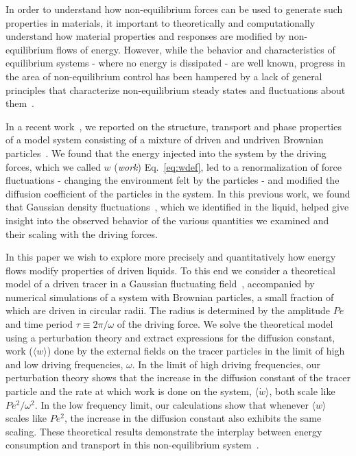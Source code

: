 \documentclass[pre,amsmath,preprintnumbers,10pt,article,notitlepage,twocolumn]{revtex4-1}
\begin{document}
In order to understand how non-equilibrium forces can be used to generate such properties in materials, it important to theoretically and computationally understand how material properties and responses are modified by non-equilibrium flows of energy. However, while the behavior and characteristics of equilibrium systems - where no energy is dissipated - are well known, progress in the area of non-equilibrium control has been hampered by a lack of general principles that characterize non-equilibrium steady states and fluctuations about them~\cite{Takatori2015,Fodor2016,Cates2015,Solon2015a,Nguyen2016,Murugan2017,Nguyen2018}. 


In a recent work~\cite{delJunco2018}, we reported on the structure, transport and phase properties of a model system consisting of a mixture of driven and undriven Brownian particles~\cite{Han2016}. We found that the energy injected into the system by the driving forces, which we called $w$ (\textit{work}) Eq.~\ref{eq:wdef}, led to a renormalization of force fluctuations - changing the environment felt by the particles - and modified the diffusion coefficient of the particles in the system. In this previous work, we found that Gaussian density fluctuations~\cite{Chandler1993}, which we identified in the liquid, helped give insight into the observed behavior of the various quantities we examined and their scaling with the driving forces.

In this paper we wish to explore more precisely and quantitatively how energy flows modify properties of driven liquids. To this end we consider a theoretical model of a driven tracer in a Gaussian fluctuating field~\cite{Chandler1993,Dean1996,Kruger2017,Demery2014}, accompanied by numerical simulations of a system with Brownian particles, a small fraction of which are driven in circular radii. The radius is determined by the amplitude $Pe$ and time period $\tau\equiv 2 \pi/\omega$ of the driving force. We solve the theoretical model using a perturbation theory and extract expressions for the diffusion constant, work ($\langle w \rangle$) done by the external fields on the tracer particles in the limit of high and low driving frequencies, $\omega$. In the limit of high driving frequencies, our perturbation theory shows that the increase in the diffusion constant of the tracer particle and the rate at which work is done on the system, $\langle {\dot w} \rangle$, both scale like $Pe^2/\omega^2$. In the low frequency limit, our calculations show that whenever $\langle w \rangle$ scales like $Pe^2$, the increase in the diffusion constant also exhibits the same scaling. These theoretical results demonstrate the interplay between energy consumption and transport in this non-equilibrium system~\cite{delJunco2018}. 
\end{document}
